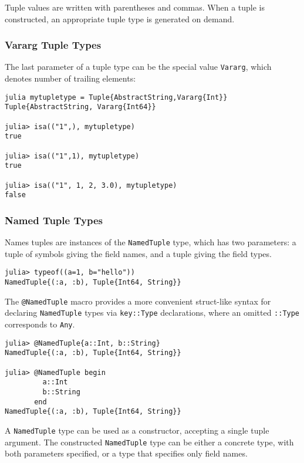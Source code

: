 \documentclass[
]{article}
\begin{document}
Tuple values are written with parentheses and commas. When a tuple is
constructed, an appropriate tuple type is generated on demand.

\hypertarget{vararg-tuple-types}{%
\subsubsection{Vararg Tuple Types}\label{vararg-tuple-types}}

The last parameter of a tuple type can be the special value
\texttt{Vararg}, which denotes number of trailing elements:

\begin{verbatim}
julia mytupletype = Tuple{AbstractString,Vararg{Int}}
Tuple{AbstractString, Vararg{Int64}}

julia> isa(("1",), mytupletype)
true

julia> isa(("1",1), mytupletype)
true

julia> isa(("1", 1, 2, 3.0), mytupletype)
false
\end{verbatim}

\hypertarget{named-tuple-types}{%
\subsubsection{Named Tuple Types}\label{named-tuple-types}}

Names tuples are instances of the \texttt{NamedTuple} type, which has
two parameters: a tuple of symbols giving the field names, and a tuple
giving the field types.

\begin{verbatim}
julia> typeof((a=1, b="hello"))
NamedTuple{(:a, :b), Tuple{Int64, String}}
\end{verbatim}

The \texttt{@NamedTuple} macro provides a more convenient struct-like
syntax for declaring \texttt{NamedTuple} types via \texttt{key::Type}
declarations, where an omitted \texttt{::Type} corresponds to
\texttt{Any}.

\begin{verbatim}
julia> @NamedTuple{a::Int, b::String}
NamedTuple{(:a, :b), Tuple{Int64, String}}

julia> @NamedTuple begin
         a::Int
         b::String
       end
NamedTuple{(:a, :b), Tuple{Int64, String}}
\end{verbatim}

A \texttt{NamedTuple} type can be used as a constructor, accepting a
single tuple argument. The constructed \texttt{NamedTuple} type can be
either a concrete type, with both parameters specified, or a type that
specifies only field names.
\end{document}
